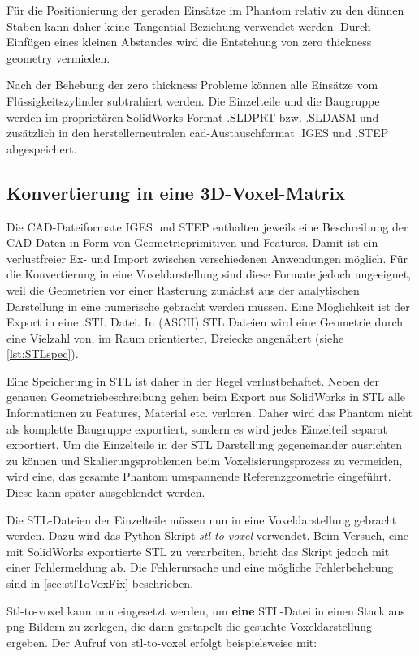 Für die Positionierung der geraden Einsätze im Phantom relativ zu den dünnen Stäben kann daher keine Tangential-Beziehung verwendet werden. Durch Einfügen eines kleinen Abstandes wird die Entstehung von zero thickness geometry vermieden.

Nach der Behebung der zero thickness Probleme können alle Einsätze vom Flüssigkeitszylinder subtrahiert werden. Die Einzelteile und die Baugruppe werden im proprietären SolidWorks Format .SLDPRT bzw. .SLDASM und zusätzlich in den herstellerneutralen \gls{cad}-Austauschformat .IGES und .STEP abgespeichert.

\subsection{Konvertierung in eine 3D-Voxel-Matrix}
Die CAD-Dateiformate IGES und STEP enthalten jeweils eine Beschreibung der CAD-Daten in Form von Geometrieprimitiven und Features. Damit ist ein verlustfreier Ex- und Import zwischen verschiedenen Anwendungen möglich. Für die Konvertierung in eine Voxeldarstellung sind diese Formate jedoch ungeeignet, weil die Geometrien vor einer Rasterung zunächst aus der analytischen Darstellung in eine numerische gebracht werden müssen. Eine Möglichkeit ist der Export in eine .STL Datei. In (ASCII) STL Dateien wird eine Geometrie durch eine Vielzahl von, im Raum orientierter, Dreiecke angenähert (siehe \autoref{lst:STLspec}).

Eine Speicherung in STL ist daher in der Regel verlustbehaftet. Neben der genauen Geometriebeschreibung gehen beim Export aus SolidWorks in STL alle Informationen zu Features, Material etc. verloren. Daher wird das Phantom nicht als komplette Baugruppe exportiert, sondern es wird jedes Einzelteil separat exportiert. Um die Einzelteile in der STL Darstellung gegeneinander ausrichten zu können und Skalierungsproblemen beim Voxelisierungsprozess zu vermeiden, wird eine, das gesamte Phantom umspannende Referenzgeometrie eingeführt. Diese kann später ausgeblendet werden.

Die STL-Dateien der Einzelteile müssen nun in eine Voxeldarstellung gebracht werden. Dazu wird das Python Skript \textit{stl-to-voxel} \cite{stlToVox} verwendet. Beim Versuch, eine mit SolidWorks exportierte STL zu verarbeiten, bricht das Skript jedoch mit einer Fehlermeldung ab. Die Fehlerursache und eine mögliche Fehlerbehebung sind in \autoref{sec:stlToVoxFix} beschrieben.

Stl-to-voxel kann nun eingesetzt werden, um \textbf{eine} STL-Datei in einen Stack aus png Bildern zu zerlegen, die dann gestapelt die gesuchte Voxeldarstellung ergeben.
Der Aufruf von stl-to-voxel erfolgt beispielsweise mit:

